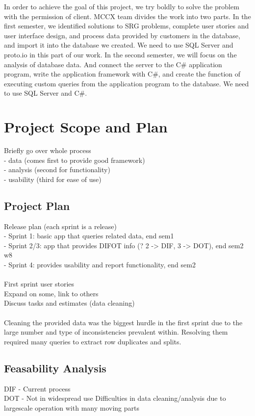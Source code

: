 \documentclass[paper=a4]{article}
\begin{document}
In order to achieve the goal of this project, we try boldly to solve the problem with the permission of client. MCCX team divides the work into two parts. In the first semester, we identified solutions to SRG problems, complete user stories and user interface design, and process data provided by customers in the database, and import it into the database we created. We need to use SQL Server and proto.io in this part of our work. In the second semester, we will focus on the analysis of database data. And connect the server to the C\# application program, write the application framework with C\#, and create the function of executing custom queries from the application program to the database. We need to use SQL Server and C\#.

\section{Project Scope and Plan}
Briefly go over whole process \\
- data (comes first to provide good framework)\\
- analysis (second for functionality) \\
- usability (third for ease of use)

\subsection{Project Plan}
Release plan (each sprint is a release) \\
- Sprint 1: basic app that queries related data, end sem1 \\
- Sprint 2/3: app that provides DIFOT info (? 2 -> DIF, 3 -> DOT), end sem2 w8 \\
- Sprint 4: provides usability and report functionality, end sem2\\
\\
First sprint user stories \\
Expand on some, link to others \\
Discuss tasks and estimates (data cleaning)\\
\\
Cleaning the provided data was the biggest hurdle in the first sprint due to the large number and type of inconsistencies 
prevalent within. Resolving them required many queries to extract row duplicates and splits. 


\subsection{Feasability Analysis}
DIF - Current process \\
DOT - Not in widespread use
Difficulties in data cleaning/analysis due to largescale operation with many moving parts
\end{document}
